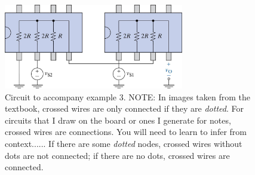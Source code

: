 \documentclass{handout}
\begin{document}
\begin{figure} [h t b]
\centering
\includegraphics[width=0.7\textwidth]{Example3.jpg}
\caption{Circuit to accompany example 3. NOTE: In images taken from the textbook, crossed wires are only connected if they are {\em dotted}.  For circuits that I draw on the board or ones I generate for notes, crossed wires are connections.  You will need to learn to infer from context...... If there are some {\em dotted} nodes, crossed wires without dots are not connected; if there are no dots, crossed wires are connected.}
\label{fig: Example3}
\end{figure}
\end{document}
